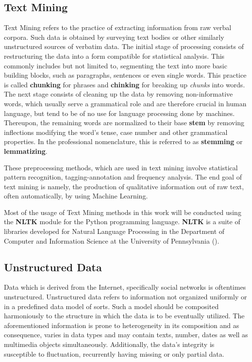 	\subsection{Text Mining}
		Text Mining refers to the practice of extracting information from raw verbal corpora. Such data is obtained by surveying text bodies or other similarly unstructured sources of verbatim data. The initial stage of processing consists of restructuring the data into a form compatible for statistical analysis. This commonly includes but not limited to, segmenting the text into more basic building blocks, such as paragraphs, sentences or even single words. This practice is called \textbf{chunking} for phrases and \textbf{chinking} for breaking up \textit{chunks} into words. The next stage consists of cleaning up the data by removing non-informative words, which usually serve a grammatical role and are therefore crucial in human language, but tend to be of no use for language processing done by machines. Thereupon, the remaining words are normalized to their base \textbf{stem} by removing inflections modifying the word's tense, case number and other grammatical properties. In the professional nomenclature, this is referred to as \textbf{stemming} or \textbf{lemmatizing}.
		\par
		These preprocessing methods, which are used in text mining involve statistical pattern recognition, tagging-annotation and frequency analysis. The end goal of text mining is namely, the production of qualitative information out of raw text, often automatically, by using Machine Learning.
		\par
		Most of the usage of Text Mining methods in this work will be conducted using the \textbf{NLTK} module for the Python programming language. \textbf{NLTK} is a suite of libraries developed for Natural Language Processing in the Department of Computer and Information Science at the University of Pennsylvania (\cite{nltk_book}).

	\subsection{Unstructured Data}
		Data which is derived from the Internet, specifically social networks is oftentimes unstructured. Unstructured data refers to information not organized uniformly or in a predefined data model of sorts. Such a model should be composited harmoniously to the structure in which the data is to be eventually utilized. The aforementioned information is prone to heterogeneity in its composition and as consequence, varies in data types and may contain texts, number, dates as well as multimedia objects simultaneously. Additionally, the data's integrity is susceptible to fluctuation, recurrently having missing or only partial data.
		
